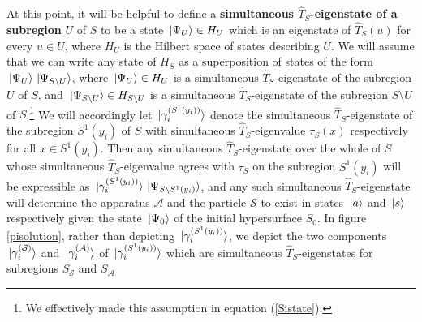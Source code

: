 At this point, it will be helpful to define a \textbf{simultaneous $\hat{T}_S$-eigenstate of a subregion} $U$ of $S$ to be a state $\ket*{\Psi_U}\in H_U$  %
%
 which is an eigenstate of $\hat{T}_S(u)$ for every $u\in U$, where $H_U$ is the Hilbert space of states describing $U$. We will assume that we can write any state of $H_S$ as a superposition of states of the form $\ket*{\Psi_U}\ket*{\Psi_{S\setminus U}}$,%
  where $\ket*{\Psi_U}\in H_U $ is  a simultaneous $\hat{T}_S$-eigenstate of the subregion $U$ of $S$, and $\ket*{\Psi_{S\setminus U}}\in H_{S\setminus U}$ is a simultaneous
$\hat{T}_S$-eigenstate of the subregion $S\setminus U$ of $S$.\footnote{We effectively made this assumption in equation (\ref{Sistate}).} We will accordingly let  
$\ket*{\gamma^{(S^1(y_i))}_i}$ %
%
 denote the simultaneous $\hat{T}_S$-eigenstate of the subregion $S^1(y_i)$ of $S$ with simultaneous $\hat{T}_S$-eigenvalue $\tau_S(x)$ respectively for all $x\in S^1(y_i)$. Then any  simultaneous $\hat{T}_S$-eigenstate over the whole of $S$  whose simultaneous $\hat{T}_S$-eigenvalue agrees with 
$\tau_S$ on the subregion $S^1(y_i)$ will be expressible as
$\ket*{\gamma^{(S^1(y_i))}_i}\ket*{\Psi_{S\setminus S^1(y_i)}}$, 
and any such simultaneous $\hat{T}_S$-eigenstate will determine the apparatus $\mathcal{A}$ and the particle $\mathcal{S}$ to exist in states $\ket*{a}$ and $\ket*{s}$ respectively given the state $\ket*{\Psi_0}$ of the initial hypersurface $S_0$. In figure \ref{pisolution}, rather than depicting $\ket*{\gamma^{(S^1(y_i))}_i}$, we depict the two components $\ket*{\gamma^{(\mathcal{S})}_i}$ and $\ket*{\gamma^{(\mathcal{A})}_i}$ %
%
 of $\ket*{\gamma^{(S^1(y_i))}_i}$ %
 which are simultaneous $\hat{T}_S$-eigenstates for subregions $S_{\mathcal{S}}$ and $S_{\mathcal{A}}$ %
